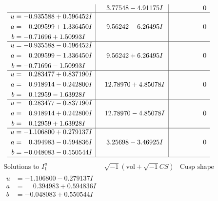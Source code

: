\documentclass[1p]{elsarticle_modified}
\theoremstyle{definition}
\newcommand{\I}{\sqrt{-1}}
\begin{document}
$$\begin{array}{c|c|c}
 & \phantom{-}3.77548 - 4.91175 I & \phantom{-0.000000 } 0 \\ \hline\begin{aligned}
u &= -0.935588 + 0.596452 I \\
a &= \phantom{-}0.209599 + 1.336450 I \\
b &= -0.71696 + 1.50993 I\end{aligned}
 & \phantom{-}9.56242 - 6.26495 I & \phantom{-0.000000 } 0 \\ \hline\begin{aligned}
u &= -0.935588 - 0.596452 I \\
a &= \phantom{-}0.209599 - 1.336450 I \\
b &= -0.71696 - 1.50993 I\end{aligned}
 & \phantom{-}9.56242 + 6.26495 I & \phantom{-0.000000 } 0 \\ \hline\begin{aligned}
u &= \phantom{-}0.283477 + 0.837190 I \\
a &= \phantom{-}0.918914 - 0.242800 I \\
b &= \phantom{-}0.12959 - 1.63928 I\end{aligned}
 & \phantom{-}12.78970 + 4.85078 I & \phantom{-0.000000 } 0 \\ \hline\begin{aligned}
u &= \phantom{-}0.283477 - 0.837190 I \\
a &= \phantom{-}0.918914 + 0.242800 I \\
b &= \phantom{-}0.12959 + 1.63928 I\end{aligned}
 & \phantom{-}12.78970 - 4.85078 I & \phantom{-0.000000 } 0 \\ \hline\begin{aligned}
u &= -1.106800 + 0.279137 I \\
a &= \phantom{-}0.394983 - 0.594836 I \\
b &= -0.048083 - 0.550544 I\end{aligned}
 & \phantom{-}3.25698 - 3.46925 I & \phantom{-0.000000 } 0\\
 \hline 
 \end{array}$$\newpage$$\begin{array}{c|c|c}  
\text{Solutions to }I^u_{1}& \I (\text{vol} + \sqrt{-1}CS) & \text{Cusp shape}\\
 \hline 
\begin{aligned}
u &= -1.106800 - 0.279137 I \\
a &= \phantom{-}0.394983 + 0.594836 I \\
b &= -0.048083 + 0.550544 I\end{aligned}

\end{array}$$
\end{document}
